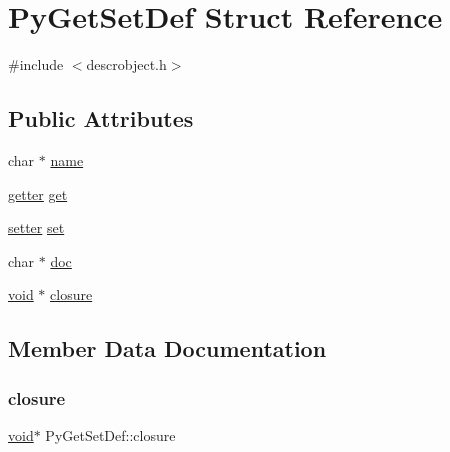\hypertarget{struct_py_get_set_def}{}\section{Py\+Get\+Set\+Def Struct Reference}
\label{struct_py_get_set_def}


{\ttfamily \#include $<$descrobject.\+h$>$}

\subsection*{Public Attributes}
\begin{DoxyCompactItemize}
\item 
char $\ast$ \mbox{\hyperlink{struct_py_get_set_def_a30046cd8a0375471ba84475c49feea5b}{name}}
\item 
\mbox{\hyperlink{descrobject_8h_ac44beb2d92298f4cdf6b605b6d9ecb25}{getter}} \mbox{\hyperlink{struct_py_get_set_def_a88b9bd1a9bde46a5bd261e03927219fa}{get}}
\item 
\mbox{\hyperlink{descrobject_8h_a92c8202514fe030a3d6b691da347af29}{setter}} \mbox{\hyperlink{struct_py_get_set_def_ae8d938614fa25c86819f06926e28e353}{set}}
\item 
char $\ast$ \mbox{\hyperlink{struct_py_get_set_def_ab3ac0bcf9fada67b8a33854192c23226}{doc}}
\item 
\mbox{\hyperlink{_s_d_l__opengles2__gl2ext_8h_ae5d8fa23ad07c48bb609509eae494c95}{void}} $\ast$ \mbox{\hyperlink{struct_py_get_set_def_ac680cc547d4fe42a3a70d85b3c7a3b31}{closure}}
\end{DoxyCompactItemize}


\subsection{Member Data Documentation}
\mbox{\label{struct_py_get_set_def_ac680cc547d4fe42a3a70d85b3c7a3b31}} 
\subsubsection{\texorpdfstring{closure}{closure}}
{\footnotesize\ttfamily \mbox{\hyperlink{_s_d_l__opengles2__gl2ext_8h_ae5d8fa23ad07c48bb609509eae494c95}{void}}$\ast$ Py\+Get\+Set\+Def\+::closure}

\mbox{\label{struct_py_get_set_def_ab3ac0bcf9fada67b8a33854192c23226}} 
